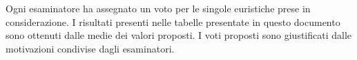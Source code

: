 Ogni esaminatore ha assegnato un voto
per le singole euristiche prese in considerazione. I risultati presenti
nelle tabelle presentate in questo documento sono ottenuti dalle medie dei
valori proposti.
I voti proposti sono giustificati dalle motivazioni condivise dagli esaminatori.